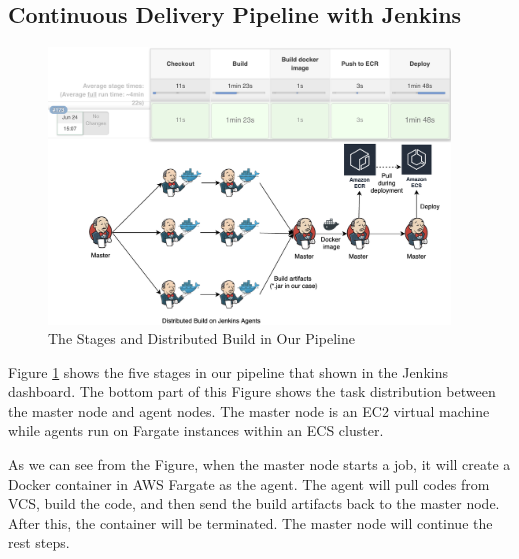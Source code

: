 \subsection{Continuous Delivery Pipeline with Jenkins}
\label{our-ci}
\begin{figure}[h]
 \centering
 \includegraphics[width=0.95\textwidth]{pics/overview.png}
 \caption{The Stages and Distributed Build in Our Pipeline}
 \label{fig:overview}
\end{figure}
Figure \ref{fig:overview} shows the five stages in our pipeline that shown in the Jenkins dashboard. The bottom part of this Figure shows the task distribution between the master node and agent nodes. The master node is an EC2 virtual machine while agents run on Fargate instances within an ECS cluster.
\par
As we can see from the Figure, when the master node starts a job, it will create a Docker container in AWS Fargate as the agent. The agent will pull codes from VCS, build the code, and then send the build artifacts back to the master node. After this, the container will be terminated. The master node will continue the rest steps.
